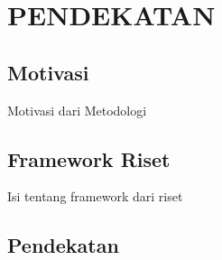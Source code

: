 
\chapter{PENDEKATAN\label{cha:3-Metodologi}}


\section{Motivasi \label{sec:3-Motivasi}}

Motivasi dari Metodologi


\section{Framework Riset\label{sub:3-Framework}}

Isi tentang framework dari riset

\section{Pendekatan\label{sec:3-Pendekatan} }

